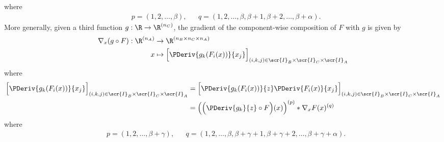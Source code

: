 \documentclass[11pt]{article}
\newcommand{\tprod}[2]{\,\,^{#1}\!\!*^{#2}}
\theoremstyle{remark}
\begin{document}
where
\begin{align*}
  &p=(1,2,\dots,\beta), &
  &q=(1,2,\dots,\beta,\beta+1,\beta+2,\dots,\beta+\alpha).
\end{align*}
More generally, given a third function $g:\R\to\R^{(n_C)}$, the gradient
of the component-wise composition of $F$ with $g$ is given by
\begin{align*}
  \nabla_x (g\circ F):\R^{(n_A)}&\to\R^{(n_B\times n_C \times n_A)}\\
  x&\mapsto \Big[\PDeriv{g_k(F_i(x))}{x_j}\Big]_{(i,k,j)\in\scr{I}_B\times\scr{I}_C\times\scr{I}_A}
\end{align*}
where
\begin{align*}
  \Big[\PDeriv{g_k(F_i(x))}{x_j}\Big]_{(i,k,j)\in\scr{I}_B\times\scr{I}_C\times\scr{I}_A}
  &= \Big[\PDeriv{g_k(F_i(x))}{z}\PDeriv{F_i(x)}{x_j}\Big]_{(i,k,j)\in\scr{I}_B\times\scr{I}_C\times\scr{I}_A}\\
  &= \Big(\Big(\PDeriv{g_k}{z} \circ F\Big)(x)\Big)^{(p)} * \nabla_x F(x)^{(q)} 
\end{align*}
where
\begin{align*}
  &p=(1,2,\dots,\beta+\gamma), &
  &q=(1,2,\dots,\beta,\beta+\gamma+1,\beta+\gamma+2,\dots,\beta+\gamma+\alpha).
\end{align*}

\end{document}
